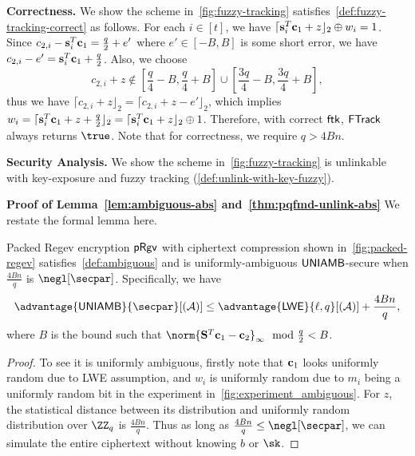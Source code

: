 \smallskip\noindent\textbf{Correctness.}
\label{sec:correct-fuzzy-tracking}
We show the scheme in~\cref{fig:fuzzy-tracking} satisfies~\cref{def:fuzzy-tracking-correct} as follows. 
For each $i\in [t]$, we have $\lceil\mathbf{s}_i^T\mathbf{c}_1+z\rfloor_2\oplus w_i=1$. Since $c_{2,i}-\mathbf{s}_i^T\mathbf{c}_1=\frac{q}{2} + e'$ where $e'\in [-B,B]$ is some short error, we have $c_{2,i}-e'=\mathbf{s}_i^T\mathbf{c}_1+\frac{q}{2}$. Also, we choose 
$$c_{2,i}+z\notin [\frac{q}{4}-B,\frac{q}{4}+B]\cup [\frac{3q}{4}-B,\frac{3q}{4}+B],
$$ thus we have $\lceil c_{2,i}+z\rfloor_2=\lceil c_{2,i}+z-e'\rfloor_2$, which implies $w_i=\lceil\mathbf{s}_i^T\mathbf{c}_1+z+\frac{q}{2} \rfloor_2=\lceil\mathbf{s}_i^T\mathbf{c}_1+z\rfloor_2\oplus 1$. Therefore, with correct $\mathsf{ftk}$, $\mathsf{FTrack}$ always returns $\true$. Note that for correctness, we require $q>4Bn$.


\smallskip\noindent\textbf{Security Analysis.}
We show the scheme in~\cref{fig:fuzzy-tracking} is unlinkable with key-exposure and fuzzy tracking (\cref{def:unlink-with-key-fuzzy}).

\noindent\textbf{Proof of  Lemma~\ref{lem:ambiguous-abs}
and~\cref{thm:pqfmd-unlink-abs}}
We restate the formal lemma here.
\begin{lemma}
\label{lem:ambiguous}
Packed Regev encryption $\mathsf{pRgv}$ with ciphertext compression shown in~\cref{fig:packed-regev} satisfies~\cref{def:ambiguous} and is uniformly-ambiguous $\mathsf{UNIAMB}$-secure when $\frac{4Bn}{q}$ is $\negl[\secpar]$. Specifically, we have
$$\advantage{\uniamb}{\secpar}[(\Ac)]\le\advantage{\lwe}{\ell,q}[(\Ac)] + \frac{4Bn}{q},
$$
where $B$ is the bound such that $\norm{\Sn^T\cn_1-\cn_2}_\infty \mod \frac{q}{2} < B$.
\end{lemma}
\begin{proof}
To see it is uniformly ambiguous, firstly note that $\mathbf{c}_1$ looks uniformly random due to LWE assumption, and $w_i$ is uniformly random due to $m_i$ being a uniformly random bit in the experiment in~\cref{fig:experiment_ambiguous}. For $z$, the statistical distance between its distribution and uniformly random distribution over $\ZZ_q$ is $\frac{4Bn}{q}$. Thus as long as $\frac{4Bn}{q}\le\negl[\secpar]$, we can simulate the entire ciphertext without knowing $b$ or $\sk$.
\end{proof}

